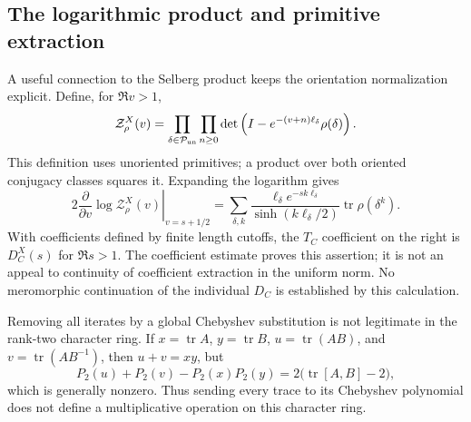 \documentclass[11pt,a4paper]{article}
\numberwithin{equation}{section}
\theoremstyle{definition}
\theoremstyle{remark}
\DeclareMathOperator{\tr}{tr}
\begin{document}
\subsection{The logarithmic product and primitive extraction}

A useful connection to the Selberg product keeps the orientation
normalization explicit. Define, for $\Re v>1$,
\begin{equation}
 \mathcal Z_\rho^X(v)
 =\prod_{\delta\in\mathcal P_{\rm un}}\prod_{n\geq0}
 \det\left(I-e^{-(v+n)\ell_\delta}\rho(\delta)\right).
 \label{eq:coeffunorientedproduct}
\end{equation}
This definition uses unoriented primitives; a product over both
oriented conjugacy classes squares it. Expanding the logarithm gives
\begin{equation}
 2\left.\frac{\partial}{\partial v}
     \log\mathcal Z_\rho^X(v)\right|_{v=s+1/2}
 =\sum_{\delta,k}
   \frac{\ell_\delta e^{-sk\ell_\delta}}
        {\sinh(k\ell_\delta/2)}\tr\rho(\delta^k).
 \label{eq:coeffproductderivative}
\end{equation}
With coefficients defined by finite length cutoffs, the $T_C$
coefficient on the right is $D_C^X(s)$ for $\Re s>1$.
The coefficient estimate proves this assertion; it is not an
appeal to continuity of coefficient extraction in the uniform norm.
No meromorphic continuation of the individual $D_C$ is established
by this calculation.

Removing all iterates by a global Chebyshev substitution is not
legitimate in the rank-two character ring. If
$x=\tr A$, $y=\tr B$, $u=\tr(AB)$, and $v=\tr(AB^{-1})$,
then $u+v=xy$, but
\begin{equation}
 P_2(u)+P_2(v)-P_2(x)P_2(y)
 =2\bigl(\tr[A,B]-2\bigr),
 \label{eq:coeffAdamsobstruction}
\end{equation}
which is generally nonzero. Thus sending every trace to its
Chebyshev polynomial does not define a multiplicative operation
on this character ring.
\end{document}
